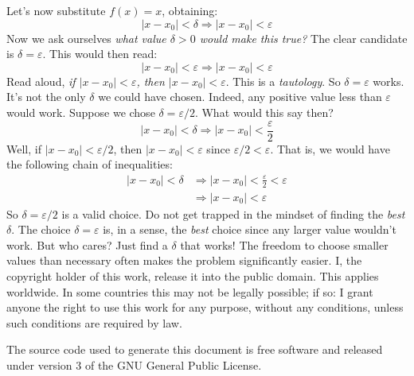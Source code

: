 \documentclass{article}
\theoremstyle{normal}
\begin{document}
    Let's now substitute $f(x)=x$, obtaining:
    \begin{equation}
        |x-x_{0}|<\delta\Rightarrow|x-x_{0}|<\varepsilon
    \end{equation}
    Now we ask ourselves \textit{what value $\delta>0$ would make this true?}
    The clear candidate is $\delta=\varepsilon$. This would then read:
    \begin{equation}
        |x-x_{0}|<\varepsilon\Rightarrow|x-x_{0}|<\varepsilon
    \end{equation}
    Read aloud,
    \textit{if $|x-x_{0}|<\varepsilon$, then $|x-x_{0}|<\varepsilon$}. This is
    a \textit{tautology}. So $\delta=\varepsilon$ works. It's not the only
    $\delta$ we could have chosen. Indeed, any positive value less than
    $\varepsilon$ would work. Suppose we chose $\delta=\varepsilon/2$. What
    would this say then?
    \begin{equation}
        |x-x_{0}|<\delta\Rightarrow|x-x_{0}|<\frac{\varepsilon}{2}
    \end{equation}
    Well, if $|x-x_{0}|<\varepsilon/2$, then
    $|x-x_{0}|<\varepsilon$ since $\varepsilon/2<\varepsilon$. That is, we
    would have the following chain of inequalities:
    \begin{align}
        |x-x_{0}|<\delta
        &\Rightarrow|x-x_{0}|<\frac{\varepsilon}{2}<\varepsilon\\
        &\Rightarrow|x-x_{0}|<\varepsilon
    \end{align}
    So $\delta=\varepsilon/2$ is a valid choice. Do not get trapped in the
    mindset of finding the \textit{best} $\delta$. The choice
    $\delta=\varepsilon$ is, in a sense, the \textit{best} choice since any
    larger value wouldn't work. But who cares? Just find a $\delta$ that works!
    The freedom to choose smaller values than necessary often makes the
    problem significantly easier.
    \newpage
    I, the copyright holder of this work, release it into the public domain.
    This applies worldwide. In some countries this may not be legally possible;
    if so: I grant anyone the right to use this work for any purpose, without
    any conditions, unless such conditions are required by law.
    \par\hfill\par
    The source code used to generate this document is free software and released
    under version 3 of the GNU General Public License.
\end{document}
